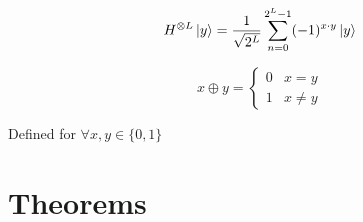 \documentclass[reprint, amsmath,amssymb, aps]{revtex4-2}
\begin{document}
        \begin{equation} \label{eqn:hadmard-nqubit}
            H^{\otimes L}\ket{y}=\frac{1}{\sqrt{2^L}}\sum\limits_{n=0}^{2^L-1}(-1)^{x\cdot y}\ket{y}
        \end{equation}

        
        \begin{equation} \label{eqn:bitwise-addition-mod2}
            x\oplus y = 
            \begin{cases}
                0 & x=y\\
                1 & x\neq y
            \end{cases}
        \end{equation}

        Defined for $\forall x,y\in\{0,1\}$
        

    \section{Theorems}

    \onecolumngrid
    \appendix
    \nocite{*}
    
        
\end{document}
